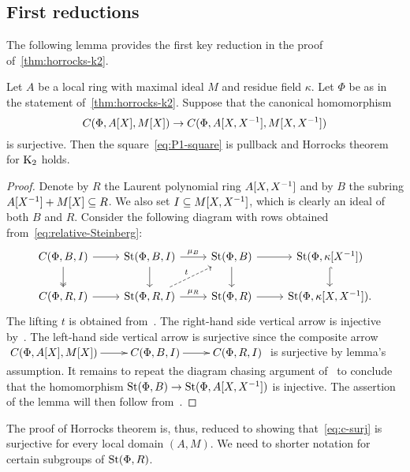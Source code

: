 \subsection{First reductions} \label{subsec:structure-theorem-overview}

The following lemma provides the first key reduction in the proof of~\cref{thm:horrocks-k2}.
\begin{lemma} \label{lem:first-reduction}
Let $A$ be a local ring with maximal ideal $M$ and residue field $\kappa$.
Let $\Phi$ be as in the statement of~\cref{thm:horrocks-k2}.
Suppose that the canonical homomorphism
\begin{equation} \label{eq:c-surj} C(\Phi, A[X], M[X]) \to C(\Phi, A[X, X^{-1}], M[X, X^{-1}]) \end{equation}
is surjective.
Then the square~\eqref{eq:P1-square} is pullback and Horrocks theorem for $\operatorname{K}_2$ holds.
\end{lemma}
\begin{proof}
    Denote by $R$ the Laurent polynomial ring $A[X, X^{-1}]$ and by $B$ the subring $A[X^{-1}] + M[X] \subseteq R$.
    We also set $I \subseteq M[X, X^{-1}]$, which is clearly an ideal of both $B$ and $R$.
    Consider the following diagram with rows obtained from~\eqref{eq:relative-Steinberg}:
    \[\begin{tikzcd}
          C(\Phi, B, I) \arrow{r} \arrow[d, swap, twoheadrightarrow] & \St(\Phi, B, I) \arrow{r}{\mu_B} \arrow{d} & \St(\Phi, B) \arrow{r} \arrow{d} & \St(\Phi, \kappa[X^{-1}]) \arrow[hookrightarrow]{d} \\
          C(\Phi, R, I) \arrow{r} & \St(\Phi, R, I) \arrow{r}{\mu_R} \arrow[ur, "t", dashrightarrow] & \St(\Phi, R) \arrow{r} & \St(\Phi, \kappa[X, X^{-1}]).
    \end{tikzcd}\]
    The lifting $t$ is obtained from~\cite[Lemma~3.3]{LS20}.
    The right-hand side vertical arrow is injective by~\cite[Lemma~2.2]{LS20}.
    The left-hand side vertical arrow is surjective since the composite arrow
    $\xymatrix{ C(\Phi, A[X], M[X]) \ar[r] & C(\Phi, B, I) \ar[r] & C(\Phi, R, I) }$
    is surjective by lemma's assumption.
    It remains to repeat the diagram chasing argument of~\cite[Theorem~1]{LS20} to conclude that the homomorphism $\operatorname{St}(\Phi, B) \to \operatorname{St}(\Phi, A[X, X^{-1}])$ is injective.
    The assertion of the lemma will then follow from~\cite[Theorem~3]{LS20}.
\end{proof}
The proof of Horrocks theorem is, thus, reduced to showing that~\eqref{eq:c-surj} is surjective for every local domain $(A, M)$.
We need to shorter notation for certain subgroups of $\operatorname{St}(\Phi, R)$.

